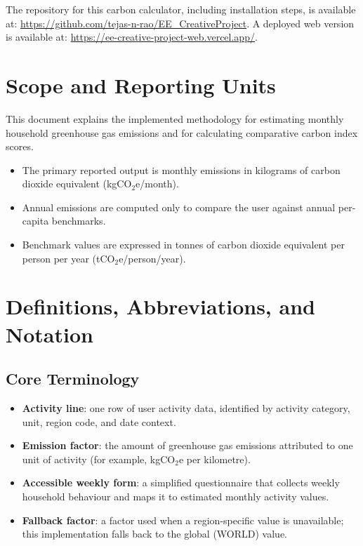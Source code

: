 \documentclass[11pt,a4paper]{article}
\begin{document}
The repository for this carbon calculator, including installation steps, is available at: \url{https://github.com/tejas-n-rao/EE_CreativeProject}. A deployed web version is available at: \url{https://ee-creative-project-web.vercel.app/}.


\section{Scope and Reporting Units}
This document explains the implemented methodology for estimating monthly household greenhouse gas emissions and for calculating comparative carbon index scores.

\begin{itemize}
  \item The primary reported output is monthly emissions in kilograms of carbon dioxide equivalent (kgCO\(_2\)e/month).
  \item Annual emissions are computed only to compare the user against annual per-capita benchmarks.
  \item Benchmark values are expressed in tonnes of carbon dioxide equivalent per person per year (tCO\(_2\)e/person/year).
\end{itemize}

\section{Definitions, Abbreviations, and Notation}
\subsection{Core Terminology}
\begin{itemize}
  \item \textbf{Activity line}: one row of user activity data, identified by activity category, unit, region code, and date context.
  \item \textbf{Emission factor}: the amount of greenhouse gas emissions attributed to one unit of activity (for example, kgCO\(_2\)e per kilometre).
  \item \textbf{Accessible weekly form}: a simplified questionnaire that collects weekly household behaviour and maps it to estimated monthly activity values.
  \item \textbf{Fallback factor}: a factor used when a region-specific value is unavailable; this implementation falls back to the global (WORLD) value.
\end{itemize}
\end{document}
